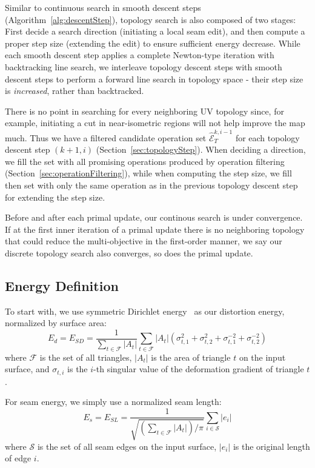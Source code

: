 Similar to continuous search in smooth descent steps (Algorithm~\ref{alg:descentStep}), topology search is also composed of two stages: First decide a search direction (initiating a local seam edit), and then compute a proper step size (extending the edit) to ensure sufficient energy decrease. While each smooth descent step applies a complete Newton-type iteration with backtracking line search, we interleave topology descent steps with smooth descent steps to perform a forward line search in topology space - their step size is \emph{increased}, rather than backtracked.

There is no point in searching for every neighboring UV topology since, for example, initiating a cut in near-isometric regions will not help improve the map much. Thus we have a filtered candidate operation set $\hat{\mathcal{E}}^{k,i-1}_T$ for each topology descent step $(k+1,i)$ (Section~\ref{sec:topologyStep}). When deciding a direction, we fill the set with all promising operations produced by operation filtering (Section~\ref{sec:operationFiltering}), while when computing the step size, we fill then set with only the same operation as in the previous topology descent step for extending the step size.

Before and after each primal update, our continous search is under convergence. If at the first inner iteration of a primal update there is no neighboring topology that could reduce the multi-objective in the first-order manner, we say our discrete topology search also converges, so does the primal update.

\subsection{Energy Definition}

To start with, we use symmetric Dirichlet energy~\cite{Smith2015Bijective} as our distortion energy, normalized by surface area:
\[ E_d = E_{SD} = \frac{1}{\sum_{t\in\mathcal{F}} |A_t|} \sum_{t\in\mathcal{F}} |A_t|(\sigma_{t,1}^2 + \sigma_{t,2}^2 + \sigma_{t,1}^{-2} + \sigma_{t,2}^{-2}) \]
where $\mathcal{F}$ is the set of all triangles, $|A_t|$ is the area of triangle $t$ on the input surface, and $\sigma_{t,i}$ is the $i$-th singular value of the deformation gradient of triangle $t$.

For seam energy, we simply use a normalized seam length:
\[ E_s = E_{SL} = \frac{1}{\sqrt{(\sum_{t\in\mathcal{F}} |A_t|)/\pi}} \sum_{i \in \mathcal{S}} |e_i| \]
where $\mathcal{S}$ is the set of all seam edges on the input surface, $|e_i|$ is the original length of edge $i$.

